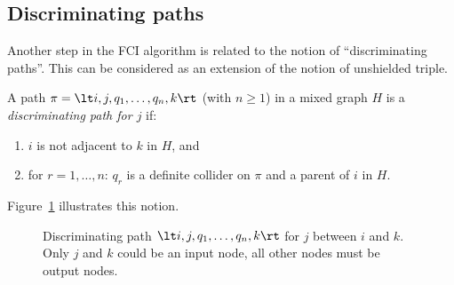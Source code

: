 \subsection{Discriminating paths}

Another step in the FCI algorithm is related to the notion of ``discriminating paths''.
This can be considered as an extension of the notion of unshielded triple.
\begin{Def}\label{def:discriminating_path}
  A path $\pi = \lt i, j, q_1, \dots, q_n, k \rt$ (with $n \ge 1$) in a mixed graph $H$ is a \emph{discriminating path for $j$} if:
  \begin{enumerate}[label=(\roman*)]
    \item $i$ is not adjacent to $k$ in $H$, and
    \item for $r=1,\dots,n$: $q_r$ is a definite collider on $\pi$ and a parent of $i$ in $H$.
  \end{enumerate}
\end{Def}
Figure~\ref{fig:discriminating_path} illustrates this notion.

\begin{figure}\centering
  \caption{Discriminating path $\lt i,j,q_1,\dots,q_n,k \rt$ for $j$ between $i$ and $k$.
  Only $j$ and $k$ could be an input node, all other nodes must be output nodes.\label{fig:discriminating_path}}
\end{figure}

